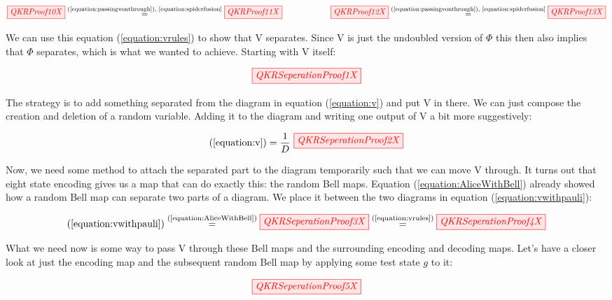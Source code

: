 \documentclass[]{article}
\newcommand{\equaltext}[1]{\ensuremath{\stackrel{\text{#1}}{=}}}
\begin{document}
\begin{equation}
\label{equation:vrules}
	\tikzfig{QKRProof10X} \equaltext{(\ref{equation:passingvonthrough}), \ref{equation:spiderfusion}} \tikzfig{QKRProof11X} ~~~~~~~~~~~~~~~~~~ \tikzfig{QKRProof12X} \equaltext{(\ref{equation:passingvonthrough}), \ref{equation:spiderfusion}} \tikzfig{QKRProof13X}
\end{equation}

We can use this equation (\ref{equation:vrules}) to show that V separates. Since V is just the undoubled version of $\Phi$ this then also implies that $\Phi$ separates, which is what we wanted to achieve. Starting with V itself:

\begin{equation}
	\label{equation:v}
	\tikzfig{QKRSeperationProof1X}
\end{equation}

The strategy is to add something separated from the diagram in equation (\ref{equation:v}) and put V in there. We can just compose the creation and deletion of a random variable. Adding it to the diagram and writing one output of V a bit more suggestively:

\begin{equation}
	\label{equation:vwithpauli}
	(\ref{equation:v}) = \frac{1}{D}~
	\tikzfig{QKRSeperationProof2X}
\end{equation}

Now, we need some method to attach the separated part to the diagram temporarily such that we can move V through. It turns out that eight state encoding gives us a map that can do exactly this: the random Bell maps. Equation (\ref{equation:AliceWithBell}) already showed how a random Bell map can separate two parts of a diagram. We place it between the two diagrams in equation (\ref{equation:vwithpauli}):

\begin{equation}
\label{equation:movevthrough}
(\ref{equation:vwithpauli}) \equaltext{(\ref{equation:AliceWithBell})} \tikzfig{QKRSeperationProof3X} \equaltext{(\ref{equation:vrules})} \tikzfig{QKRSeperationProof4X}
\end{equation}

What we need now is some way to pass V through these Bell maps and the surrounding encoding and decoding maps. Let's have a closer look at just the encoding map and the subsequent random Bell map by applying some test state $g$ to it:

\begin{equation}
	\label{equation:RedSpiderRandomPauli}
	\tikzfig{QKRSeperationProof5X}
\end{equation}
\end{document}
